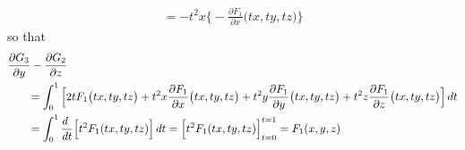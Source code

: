 \begin{solution}
\begin{align*}
=-t^2x\Big\{-\frac{\partial F_1}{\partial x}\big(tx,ty,tz\big)\Big\}
\end{align*}
so that
\begin{align*}
&\pdiff{G_3}{y}-\pdiff{G_2}{z} \\
&\hskip0.25in=\int_0^1 \Big[2tF_1\big(tx,ty,tz\big)+
t^2x\frac{\partial F_1}{\partial x}\big(tx,ty,tz\big)
+t^2y\frac{\partial F_1}{\partial y}\big(tx,ty,tz\big)
+t^2z\frac{\partial F_1}{\partial z}\big(tx,ty,tz\big)\Big]\,dt\\
&\hskip0.25in=\int_0^1 \frac{d\hfill}{dt}\Big[ t^2 F_1(tx,ty,tz)\Big]\,dt
=\Big[ t^2 F_1(tx,ty,tz)\Big]^{t=1}_{t=0}
= F_1(x,y,z)
\end{align*}
\end{solution}


